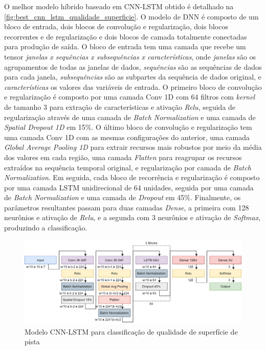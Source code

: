 O melhor modelo híbrido baseado em CNN-LSTM obtido é detalhado na \autoref{fig:best_cnn_lstm_qualidade_superficie}. O modelo de DNN é composto de um bloco de entrada, dois blocos de convolução e regularização, dois blocos recorrentes e de regularização e dois blocos de camada totalmente conectadas para produção de saída. O bloco de entrada tem uma camada que recebe um tensor \emph{janelas x sequências x subsequências x características}, onde \emph{janelas} são os agrupamentos de todas as janelas de dados, \emph{sequências} são as sequências de dados para cada janela, \emph{subsequências} são as subpartes da sequência de dados original, e \emph{características} os valores das variáveis de entrada. O primeiro bloco de convolução e regularização é composto por uma camada Conv 1D com 64 filtros com \textit{kernel} de tamanho 3 para extração de características e ativação \textit{Relu}, seguida de regularização através de uma camada de \textit{Batch Normalization} e uma camada de \textit{Spatial Dropout 1D} em 15\%. O último bloco de convolução e regularização tem uma camada Conv 1D com as mesmas configurações do anterior, uma camada \textit{Global Average Pooling 1D} para extrair recursos mais robustos por meio da média dos valores em cada região, uma camada \textit{Flatten} para reagrupar os recursos extraídos na sequência temporal original, e regularização por camada de \textit{Batch Normalization}. Em seguida, cada bloco de recorrência e regularização é composto por uma camada LSTM unidirecional de 64 unidades, seguida por uma camada de \textit{Batch Normalization} e uma camada de \textit{Dropout} em 45\%. Finalmente, os parâmetros resultantes passam para duas camadas \textit{Dense}, a primeira com 128 neurônios e ativação de \textit{Relu}, e a segunda com 3 neurônios e ativação de \textit{Softmax}, produzindo a classificação. 

\begin{figure}[h!]
  \centering
  \caption{Modelo CNN-LSTM para classificação de qualidade de superfície de pista}
  \label{fig:best_cnn_lstm_qualidade_superficie}
  \includegraphics[width=1\textwidth]{figuras/fig_49.png}
\end{figure}

